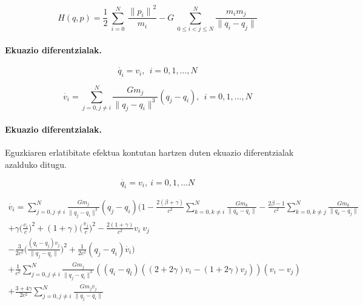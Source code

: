 \begin{equation}
H(q,p)=\frac{1}{2}\ \sum^N_{i=0}{\ \frac{{\|p_i\|}^2}{m_i}}-G\ \sum^N_{0\le i<j\le N}{\frac{m_im_j}{\|q_i-q_j\|}} 
\end{equation}

\paragraph*{Ekuazio diferentzialak.}

\begin{equation}
\dot{q_i}=v_i, \ \  i=0,1,\dots, N
\end{equation}

\begin{equation}
\dot{v_i}= \sum_{j=0,j \neq i}^{N} \frac{Gm_j}{\|q_j-q_i\|^3} (q_j-q_i) , \ \  i=0,1,\dots, N
\end{equation}

\paragraph*{Ekuazio diferentzialak.}
Eguzkiaren erlatibitate efektua kontutan hartzen duten ekuazio diferentzialak azalduko ditugu.

\begin{equation}
\dot{q_i}=v_i, \  i=0,1,\dots N
\end{equation}

\begin{multline} 
\dot{v_i}= \sum_{j=0,j \neq i}^{N} \frac{Gm_j}{\|q_j-q_i\|^3} (q_j-q_i)
           \bigg(1- \frac{2(\beta+\gamma)}{c^2} \sum\limits_{k=0, k \neq i}^{N} \frac{Gm_k}{\|q_k-q_i\|} 
                  - \frac{2\beta-1}{c^2}        \sum\limits_{k=0, k \neq j}^{N} \frac{Gm_k}{\|q_k-q_j\|} \\
                  + \gamma \big(\frac{v_i}{c}\big)^2 + (1+\gamma) \big(\frac{v_j}{c} \big)^2 
                  - \frac{2(1+\gamma)}{c^2} v_i \ v_j \\
                  - \frac{3}{2c^2} \big(\frac{(q_i-q_j) v_j}{\|q_j-q_i\|} \big)^2+                  
                  \frac{1}{2c^2}(q_j-q_i) \dot{v_i} \bigg) \\
           + \frac{1}{c^2} \sum_{j=0,j \neq i}^{N} \frac{Gm_j}{\|q_j-q_i\|^3} 
             ((q_i-q_l) ((2+2\gamma)v_i-(1+2\gamma)v_j)) (v_i-v_j) \\
           + \frac{3+4\gamma}{2c^2} \sum_{j=0,j \neq i}^{N} \frac{Gm_j \dot{v_j}}{\|q_j-q_i\|}                                      
\end{multline}

